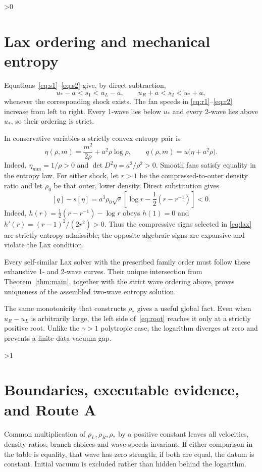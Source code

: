\documentclass[10pt]{article}
\providecommand{\CRevisionRound}{2}
\begin{document}
\ifnum\CRevisionRound>0
\section{Lax ordering and mechanical entropy}
Equations~\eqref{eq:s1}--\eqref{eq:s2} give, by direct subtraction,
\begin{equation}\label{eq:lax}
 u_*-a<s_1<u_L-a,\qquad
 u_R+a<s_2<u_*+a,
\end{equation}
whenever the corresponding shock exists.  The fan speeds in
\eqref{eq:r1}--\eqref{eq:r2} increase from left to right.  Every 1-wave lies
below $u_*$ and every 2-wave lies above $u_*$, so their ordering is strict.

In conservative variables a strictly convex entropy pair is
\begin{equation}\label{eq:entropy}
 \eta(\rho,m)=\frac{m^2}{2\rho}+a^2\rho\log\rho,
 \qquad q(\rho,m)=u\bigl(\eta+a^2\rho\bigr).
\end{equation}
Indeed, $\eta_{mm}=1/\rho>0$ and
$\det D^2\eta=a^2/\rho^2>0$.  Smooth fans satisfy equality in the entropy
law.  For either shock, let $r>1$ be the compressed-to-outer density ratio
and let $\rho_0$ be that outer, lower density.  Direct substitution gives
\begin{equation}\label{eq:entropyproduction}
 [q]-s[\eta]=a^3\rho_0\sqrt r
 \left[\log r-\frac12(r-r^{-1})\right]<0.
\end{equation}
Indeed, $h(r)=\frac12(r-r^{-1})-\log r$ obeys $h(1)=0$ and
$h'(r)=(r-1)^2/(2r^2)>0$.  Thus the compressive signs selected in
\eqref{eq:lax} are strictly entropy admissible; the opposite algebraic signs
are expansive and violate the Lax condition.

Every self-similar Lax solver with the prescribed family order must follow
these exhaustive 1- and 2-wave curves.  Their unique intersection from
Theorem~\ref{thm:main}, together with the strict wave ordering above, proves
uniqueness of the assembled two-wave entropy solution.

The same monotonicity that constructs $\rho_*$ gives a useful global fact.
Even when $u_R-u_L$ is arbitrarily large, the left side of~\eqref{eq:root}
reaches it only at a strictly positive root.  Unlike the $\gamma>1$
polytropic case, the logarithm diverges at zero and prevents a finite-data
vacuum gap.
\fi

\ifnum\CRevisionRound>1
\section{Boundaries, executable evidence, and Route A}
Common multiplication of $\rho_L,\rho_R,\rho_*$ by a positive constant leaves
all velocities, density ratios, branch choices and wave speeds invariant.
If either comparison in the table is equality, that wave has zero strength;
if both are equal, the datum is constant.  Initial vacuum is excluded rather
than hidden behind the logarithm.
\end{document}
